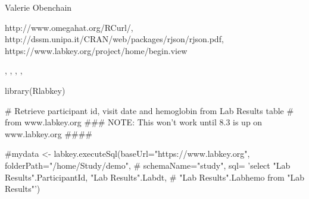 \begin{Author}\relax
Valerie Obenchain
\end{Author}
\begin{References}\relax
http://www.omegahat.org/RCurl/,\\ 
http://dssm.unipa.it/CRAN/web/packages/rjson/rjson.pdf,\\
https://www.labkey.org/project/home/begin.view
\end{References}
\begin{SeeAlso}\relax
{}, , , 
, 
\end{SeeAlso}
\begin{Examples}
\begin{ExampleCode}

library(Rlabkey)

# Retrieve participant id, visit date and hemoglobin from Lab Results table
# from www.labkey.org
### NOTE: This won't work until 8.3 is up on www.labkey.org ####

#mydata <- labkey.executeSql(baseUrl="https://www.labkey.org", folderPath="/home/Study/demo", 
# schemaName="study", sql= 'select "Lab Results".ParticipantId, "Lab Results".Labdt, 
# "Lab Results".Labhemo from "Lab Results"')

\end{ExampleCode}
\end{Examples}

